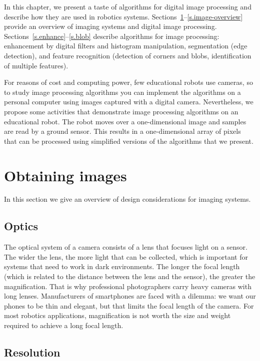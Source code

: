 In this chapter, we present a taste of algorithms for digital image processing and describe how they are used in robotics systems. Sections~\ref{s.obtaining-images}--\ref{s.image-overview} provide an overview of imaging systems and digital image processing. Sections~\ref{s.enhance}--\ref{s.blob} describe algorithms for image processing: enhancement by digital filters and histogram manipulation, segmentation (edge detection), and feature recognition (detection of corners and blobs, identification of multiple features).

For reasons of cost and computing power, few educational robots use cameras, so to study image processing algorithms you can implement the algorithms on a personal computer using images captured with a digital camera. Nevertheless, we propose some activities that demonstrate image processing algorithms on an educational robot. The robot moves over a one-dimensional image and samples are read by a ground sensor. This results in a one-dimensional array of pixels that can be processed using simplified versions of the algorithms that we present.

\section{Obtaining images}\label{s.obtaining-images}

In this section we give an overview of design considerations for imaging systems.

\subsection*{Optics}
The optical system of a camera consists of a lens that focuses light on a sensor. The wider the lens, the more light that can be collected, which is important for systems that need to work in dark environments. The longer the focal length (which is related to the distance between the lens and the sensor), the greater the magnification. That is why professional photographers carry heavy cameras with long lenses. Manufacturers of smartphones are faced with a dilemma: we want our phones to be thin and elegant, but that limits the focal length of the camera. For most robotics applications, magnification is not worth the size and weight required to achieve a long focal length.

\subsection*{Resolution}

